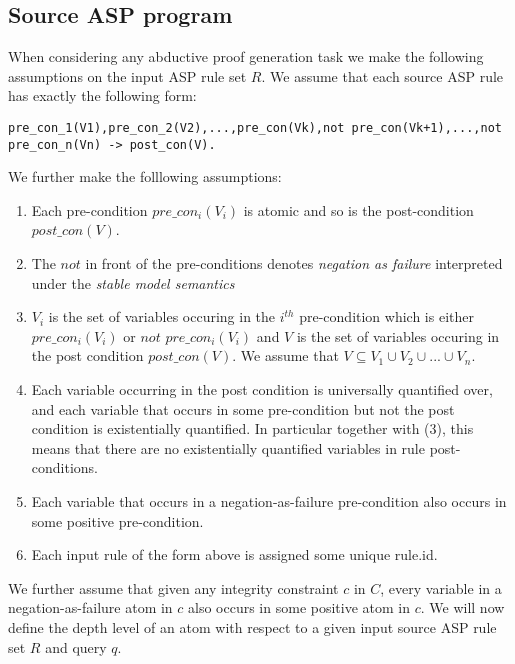 \documentclass{article}
\begin{document}
\subsection{Source ASP program}

When considering any abductive proof generation task we make the following assumptions on the input ASP rule set $R$. We assume that each source ASP rule has exactly the following form:
\begin{verbatim}
pre_con_1(V1),pre_con_2(V2),...,pre_con(Vk),not pre_con(Vk+1),...,not pre_con_n(Vn) -> post_con(V).
\end{verbatim}
We further make the folllowing assumptions:

\begin{enumerate}
    \item Each pre-condition $pre\_con_{i}(V_{i})$ is atomic and so is the post-condition $post\_con(V)$.
    \item The $not$ in front of the pre-conditions denotes \textit{negation as failure} interpreted under the \textit{stable model semantics}
    \item $V_{i}$ is the set of variables occuring in the $i^{th}$ pre-condition which is either $pre\_con_{i}(V_{i})$ or $not$ $pre\_con_{i}(V_{i})$ and $V$ is the set of variables occuring in the post condition $post\_con(V)$. We assume that $V\subseteq V_{1}\cup V_{2}\cup ... \cup V_{n}$.
    \item Each variable occurring in the post condition is universally quantified over, and each variable that occurs in some pre-condition but not the post condition is existentially quantified. In particular together with (3), this means that there are no existentially quantified variables in rule post-conditions.
    \item Each variable that occurs in a negation-as-failure pre-condition also occurs in some positive pre-condition.
    \item Each input rule of the form above is assigned some unique rule.id.
\end{enumerate}

We further assume that given any integrity constraint $c$ in $C$, every variable in a negation-as-failure atom in $c$ also occurs in some positive atom in $c$. We will now define the depth level of an atom with respect to a given input source ASP rule set $R$ and query $q$.
\end{document}
